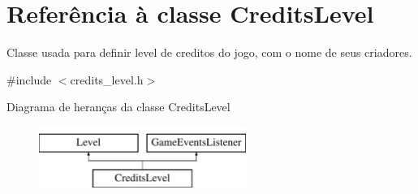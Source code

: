\hypertarget{classCreditsLevel}{}\section{Referência à classe Credits\+Level}
\label{classCreditsLevel}


Classe usada para definir level de creditos do jogo, com o nome de seus criadores.  




{\ttfamily \#include $<$credits\+\_\+level.\+h$>$}

Diagrama de heranças da classe Credits\+Level\begin{figure}[H]
\begin{center}
\leavevmode
\includegraphics[height=2.000000cm]{classCreditsLevel}
\end{center}
\end{figure}
